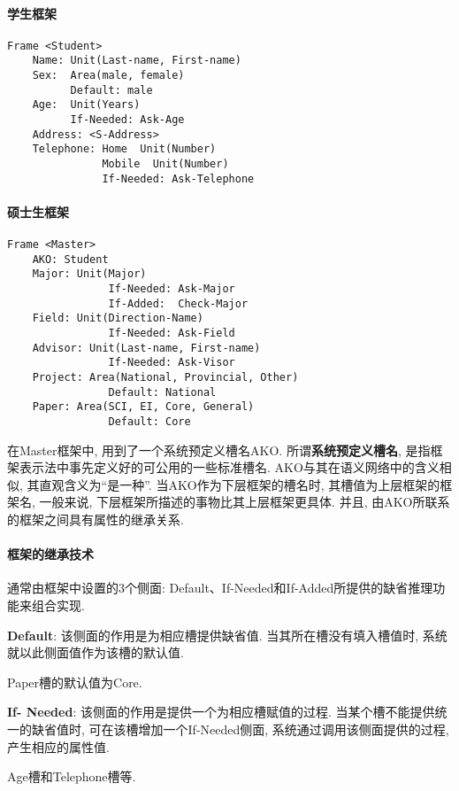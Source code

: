 \paragraph{学生框架}
\begin{Verbatim}
Frame <Student>
    Name: Unit(Last-name, First-name)
    Sex:  Area(male, female)
          Default: male
    Age:  Unit(Years)
          If-Needed: Ask-Age
    Address: <S-Address>
    Telephone: Home  Unit(Number)
               Mobile  Unit(Number)
               If-Needed: Ask-Telephone
\end{Verbatim}
\paragraph{硕士生框架}
\begin{Verbatim}
Frame <Master>
    AKO: Student
    Major: Unit(Major)
                If-Needed: Ask-Major
                If-Added:  Check-Major
    Field: Unit(Direction-Name)
                If-Needed: Ask-Field
    Advisor: Unit(Last-name, First-name)
                If-Needed: Ask-Visor
    Project: Area(National, Provincial, Other)
                Default: National
    Paper: Area(SCI, EI, Core, General)
                Default: Core
\end{Verbatim}
在Master框架中, 用到了一个系统预定义槽名AKO. 所谓\textbf{系统预定义槽名}, 是指框架表示法中事先定义好的可公用的一些标准槽名. AKO与其在语义网络中的含义相似, 其直观含义为“是一种”.
当AKO作为下层框架的槽名时, 其槽值为上层框架的框架名, 一般来说, 下层框架所描述的事物比其上层框架更具体. 并且, 由AKO所联系的框架之间具有属性的继承关系.
\paragraph{框架的继承技术} 通常由框架中设置的3个侧面: Default、If-Needed和If-Added所提供的缺省推理功能来组合实现.

\textbf{Default}: 该侧面的作用是为相应槽提供缺省值. 当其所在槽没有填入槽值时, 系统就以此侧面值作为该槽的默认值.
\begin{example}
  Paper槽的默认值为Core.
\end{example}

\textbf{If- Needed}: 该侧面的作用是提供一个为相应槽赋值的过程. 当某个槽不能提供统一的缺省值时, 可在该槽增加一个If-Needed侧面, 系统通过调用该侧面提供的过程, 产生相应的属性值.
\begin{example}
  Age槽和Telephone槽等.
\end{example}

